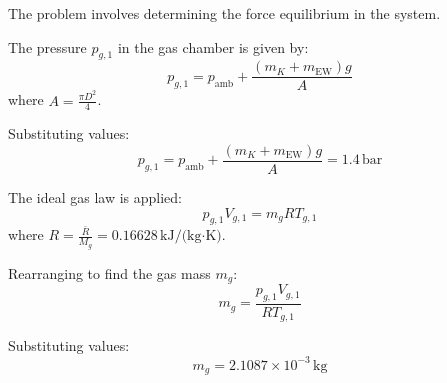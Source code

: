 The problem involves determining the force equilibrium in the system.  

The pressure \( p_{g,1} \) in the gas chamber is given by:  
\[
p_{g,1} = p_{\text{amb}} + \frac{(m_K + m_{\text{EW}}) g}{A}
\]  
where \( A = \frac{\pi D^2}{4} \).  

Substituting values:  
\[
p_{g,1} = p_{\text{amb}} + \frac{(m_K + m_{\text{EW}}) g}{A} = 1.4 \, \text{bar}
\]  

The ideal gas law is applied:  
\[
p_{g,1} V_{g,1} = m_g R T_{g,1}
\]  
where \( R = \frac{\bar{R}}{M_g} = 0.16628 \, \text{kJ/(kg·K)} \).  

Rearranging to find the gas mass \( m_g \):  
\[
m_g = \frac{p_{g,1} V_{g,1}}{R T_{g,1}}
\]  

Substituting values:  
\[
m_g = 2.1087 \times 10^{-3} \, \text{kg}
\]